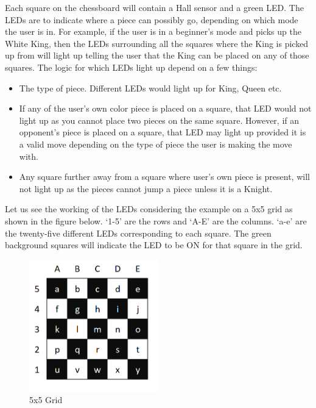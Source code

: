 \documentclass[12pt, titlepage]{article}
\begin{document}
Each square on the chessboard will contain a Hall sensor and a green LED. The LEDs are to indicate where a piece can possibly go, depending on which mode the user is in. For example, 
if the user is in a beginner’s mode and picks up the White King, then the LEDs surrounding all the squares where the King is picked up from will light up telling the user that the 
King can be placed on any of those squares. The logic for which LEDs light up depend on a few things:
\begin{itemize}
  \item The type of piece. Different LEDs would light up for King, Queen etc.
  \item If any of the user’s own color piece is placed on a square, that LED would not light up as you cannot place two pieces on the same square. However, if an opponent’s piece is 
  placed on a square, that LED may light up provided it is a valid move depending on the type of piece the user is making the move with.
  \item Any square further away from a square where user’s own piece is present, will not light up as the pieces cannot jump a piece unless it is a Knight.
\end{itemize}
  Let us see the working of the LEDs considering the example on a 5x5 grid as shown in the figure below. ‘1-5’ are the rows and ‘A-E’ are the columns. ‘a-e’ are the twenty-five different LEDs corresponding to 
  each square. The green background squares will indicate the LED to be ON for that square in the grid.

  \begin{figure}[h]
    \centering
    \includegraphics[width=0.5\textwidth]{line2}
    \caption{5x5 Grid}
  \end{figure}
\end{document}
